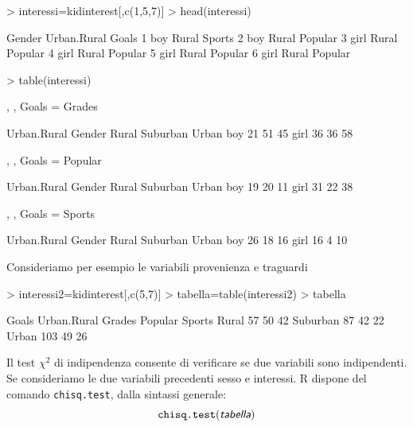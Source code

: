 \documentclass[onecolumn,12pt]{book}
\newcommand{\varia}[1]{\textsl{\textsf{#1}}}
\begin{document}
\begin{Schunk}
\begin{Sinput}
> interessi=kidinterest[,c(1,5,7)]
> head(interessi)
\end{Sinput}
\begin{Soutput}
  Gender Urban.Rural   Goals
1    boy       Rural  Sports
2    boy       Rural Popular
3   girl       Rural Popular
4   girl       Rural Popular
5   girl       Rural Popular
6   girl       Rural Popular
\end{Soutput}
\begin{Sinput}
> table(interessi)
\end{Sinput}
\begin{Soutput}
, , Goals = Grades

      Urban.Rural
Gender Rural Suburban Urban
  boy     21       51    45
  girl    36       36    58

, , Goals = Popular

      Urban.Rural
Gender Rural Suburban Urban
  boy     19       20    11
  girl    31       22    38

, , Goals = Sports

      Urban.Rural
Gender Rural Suburban Urban
  boy     26       18    16
  girl    16        4    10
\end{Soutput}
\end{Schunk}
Consideriamo per esempio le variabili provenienza e traguardi
\begin{Schunk}
\begin{Sinput}
> interessi2=kidinterest[,c(5,7)]
> tabella=table(interessi2)
> tabella
\end{Sinput}
\begin{Soutput}
           Goals
Urban.Rural Grades Popular Sports
   Rural        57      50     42
   Suburban     87      42     22
   Urban       103      49     26
\end{Soutput}
\end{Schunk}
 
Il test $\chi^2$  di indipendenza consente di  verificare se  due variabili sono indipendenti.
Se consideriamo le due variabili precedenti sesso e interessi.
\textsf{R}  dispone del comando \texttt{chisq.test},
dalla sintassi generale:$$\texttt{chisq.test}(\varia{tabella})$$
\end{document}
